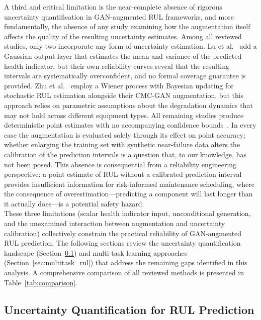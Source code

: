 \documentclass[review]{elsarticle}
\begin{document}
A third and critical limitation is the near-complete absence of
rigorous uncertainty quantification in GAN-augmented RUL frameworks,
and more fundamentally, the absence of any study examining how the
augmentation itself affects the quality of the resulting uncertainty
estimates. Among all reviewed studies, only two incorporate any form
of uncertainty estimation.
Lu et al.~\cite{lu_joint_2022} add a Gaussian output layer that
estimates the mean and variance of the predicted health indicator,
but their own reliability curves reveal that the resulting intervals
are systematically overconfident, and no formal coverage guarantee is
provided. Zhu et al.~\cite{lubricants13040145} employ a Wiener
process with Bayesian updating for stochastic RUL estimation
alongside their CMC-GAN augmentation, but this approach relies on
parametric assumptions about the degradation dynamics that may not
hold across different equipment types.
All remaining studies produce deterministic point estimates with no
accompanying confidence
bounds~\cite{9486650, vibration7020029, 9300234,
xiong_controlled_2023, behera_generative_2021, cheng_remaining_2023,
wen_gru-ae-wiener_2024}. In every case the augmentation is evaluated
solely through its effect on point accuracy; whether enlarging the
training set with synthetic near-failure data alters the calibration
of the prediction intervals is a question that, to our knowledge, has
not been posed. This absence is consequential from a
reliability engineering perspective: a point estimate of
RUL without a calibrated prediction interval provides insufficient
information for risk-informed maintenance scheduling, where the
consequence of overestimation---predicting a component will last
longer than it actually does---is a potential safety hazard.\\

These three limitations (scalar health indicator input,
unconditional generation, and the unexamined interaction between
augmentation and uncertainty calibration) collectively constrain the
practical reliability of GAN-augmented RUL prediction. The following
sections review the uncertainty quantification landscape
(Section~\ref{sec:uq_rul}) and multi-task learning approaches
(Section~\ref{sec:multitask_rul}) that address the remaining gaps
identified in this analysis. A comprehensive comparison of all
reviewed methods is presented in Table~\ref{tab:comparison}.


\subsection{Uncertainty Quantification for RUL Prediction}
\label{sec:uq_rul}
\end{document}
